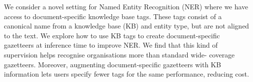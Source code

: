 We consider a novel setting for Named Entity Recognition (NER) where we have access to document-specific knowledge base tags. These tags consist of a canonical name from a knowledge base (KB) and entity type, but are not aligned to the text. We explore how to use KB tags to create document-specific gazetteers at inference time to improve NER. We find that this kind of supervision helps recognise organisations more than standard wide- coverage gazetteers. Moreover, augmenting document-specific gazetteers with KB information lets users specify fewer tags for the same performance, reducing cost.
